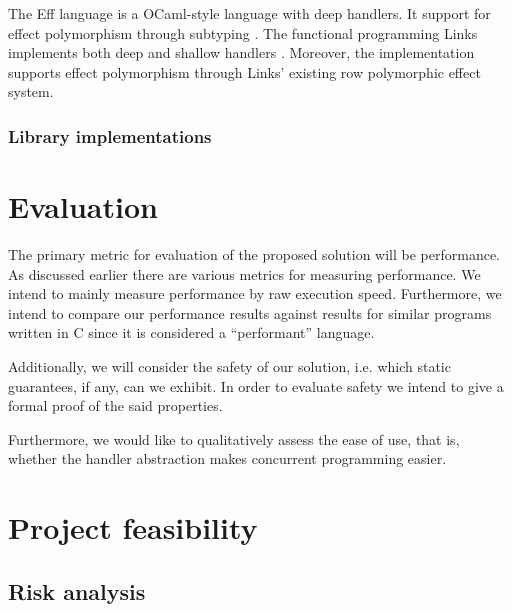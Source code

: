 \documentclass[preprint,10pt,numbers]{sigplanconf}
\begin{document}
The Eff language is a OCaml-style language with deep handlers. It support for effect polymorphism through subtyping \cite{Bauer2015}. 
The functional programming Links implements both deep and shallow handlers \cite{Hillerstrom2015}. Moreover, the implementation supports effect polymorphism through Links' existing row polymorphic effect system.
    
  \subsubsection{Library implementations}\label{sec:library}

  \section{Evaluation}
  The primary metric for evaluation of the proposed solution will be performance. As discussed earlier there are various metrics for measuring performance. We intend to mainly measure performance by raw execution speed. Furthermore, we intend to compare our performance results against results for similar programs written in C since it is considered a ``performant'' language. 

Additionally, we will consider the safety of our solution, i.e. which static guarantees, if any, can we exhibit. In order to evaluate safety we intend to give a formal proof of the said properties.

Furthermore, we would like to qualitatively assess the ease of use, that is, whether the handler abstraction makes concurrent programming easier.

  \section{Project feasibility}
  \subsection{Risk analysis}
\end{document}
